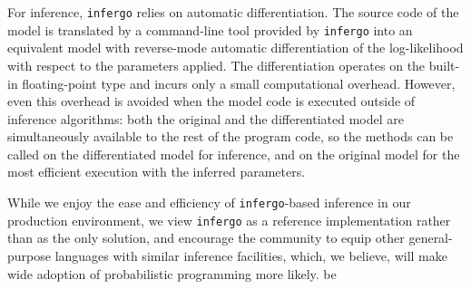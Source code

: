 \documentclass[sigplan,review]{acmart}\settopmatter{printfolios=true,printccs=false,printacmref=false}
\begin{document}
For inference, \texttt{infergo} relies on automatic
differentiation. The source code of the model is
translated by a command-line tool provided by \texttt{infergo}
into an equivalent model with reverse-mode automatic
differentiation of the log-likelihood with respect 
to the parameters applied. The differentiation operates
on the built-in floating-point type and incurs only a small
computational overhead. However, even this overhead is avoided
when the model code is executed outside of inference algorithms:
both the original and the differentiated model are
simultaneously available to the rest of the program code, so
the methods can be called on the differentiated model for
inference, and on the original model for the most efficient
execution with the inferred parameters.

While we enjoy the ease and efficiency of
\texttt{infergo}-based inference in our production environment,
we view \texttt{infergo} as a reference implementation rather than
as the only solution, and encourage the community to equip other
general-purpose languages with similar inference facilities,
which, we believe, will make wide adoption of probabilistic
programming more likely.
be


\end{document}
